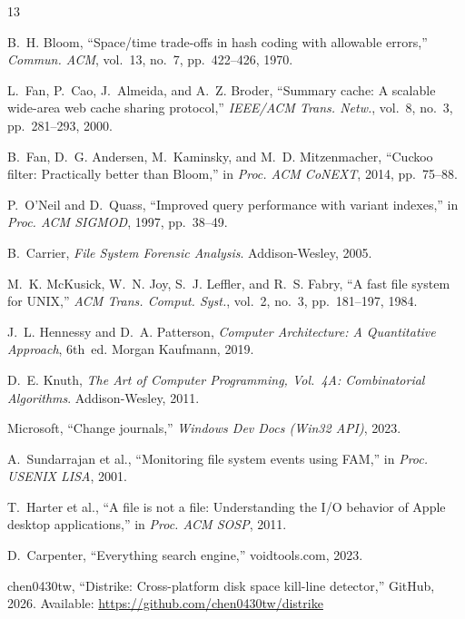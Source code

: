 \documentclass[11pt,twocolumn]{article}
\begin{document}
\begin{thebibliography}{13}

B.~H. Bloom, ``Space/time trade-offs in hash coding with allowable errors,'' \emph{Commun. ACM}, vol.~13, no.~7, pp.~422--426, 1970.

L.~Fan, P.~Cao, J.~Almeida, and A.~Z. Broder, ``Summary cache: A scalable wide-area web cache sharing protocol,'' \emph{IEEE/ACM Trans. Netw.}, vol.~8, no.~3, pp.~281--293, 2000.

B.~Fan, D.~G. Andersen, M.~Kaminsky, and M.~D. Mitzenmacher, ``Cuckoo filter: Practically better than Bloom,'' in \emph{Proc. ACM CoNEXT}, 2014, pp.~75--88.

P.~O'Neil and D.~Quass, ``Improved query performance with variant indexes,'' in \emph{Proc. ACM SIGMOD}, 1997, pp.~38--49.

B.~Carrier, \emph{File System Forensic Analysis}. Addison-Wesley, 2005.

M.~K. McKusick, W.~N. Joy, S.~J. Leffler, and R.~S. Fabry, ``A fast file system for UNIX,'' \emph{ACM Trans. Comput. Syst.}, vol.~2, no.~3, pp.~181--197, 1984.

J.~L. Hennessy and D.~A. Patterson, \emph{Computer Architecture: A Quantitative Approach}, 6th~ed. Morgan Kaufmann, 2019.

D.~E. Knuth, \emph{The Art of Computer Programming, Vol.~4A: Combinatorial Algorithms}. Addison-Wesley, 2011.

Microsoft, ``Change journals,'' \emph{Windows Dev Docs (Win32 API)}, 2023.

A.~Sundarrajan et al., ``Monitoring file system events using FAM,'' in \emph{Proc. USENIX LISA}, 2001.

T.~Harter et al., ``A file is not a file: Understanding the I/O behavior of Apple desktop applications,'' in \emph{Proc. ACM SOSP}, 2011.

D.~Carpenter, ``Everything search engine,'' voidtools.com, 2023.

chen0430tw, ``Distrike: Cross-platform disk space kill-line detector,'' GitHub, 2026. Available: \url{https://github.com/chen0430tw/distrike}

\end{thebibliography}
\end{document}
